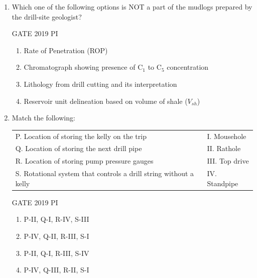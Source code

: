 \documentclass[journal,12pt,onecolumn]{IEEEtran}
\theoremstyle{remark}
\begin{document}
\begin{enumerate}
Which one of the following match the relation between $R_w$ and $R_{mf}$ to that of Self Potential (SP) log deflection?

\hfill{GATE 2019 PI}

\begin{multicols}{2}
\begin{enumerate}
    \item P-I, Q-III, R-II
    \item P-III, Q-I, R-II
    \item P-II, Q-I, R-III
    \item P-I, Q-II, R-III
\end{enumerate}
\end{multicols}

\item Which one of the following options is NOT a part of the mudlogs prepared by the drill-site geologist?

\hfill{GATE 2019 PI}

\begin{multicols}{2}
\begin{enumerate}
    \item Rate of Penetration (ROP)
    \item Chromatograph showing presence of C$_1$ to C$_5$ concentration
    \item Lithology from drill cutting and its interpretation
    \item Reservoir unit delineation based on volume of shale ($V_{sh}$)
\end{enumerate}
\end{multicols}
\item Match the following:

\begin{tabular}{ll}
P. Location of storing the kelly on the trip & I. Mousehole \\
Q. Location of storing the next drill pipe    & II. Rathole \\
R. Location of storing pump pressure gauges   & III. Top drive \\
S. Rotational system that controls a drill string without a kelly & IV. Standpipe \\
\end{tabular}

\hfill{GATE 2019 PI}

\begin{multicols}{2}
\begin{enumerate}
    \item P-II, Q-I, R-IV, S-III
    \item P-IV, Q-II, R-III, S-I
    \item P-II, Q-I, R-III, S-IV
    \item P-IV, Q-III, R-II, S-I
\end{enumerate}
\end{multicols}


\end{enumerate}
\end{document}
